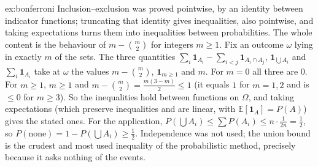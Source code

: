 \begin{solution}{ex:bonferroni}
\idea Inclusion--exclusion was proved pointwise, by an identity between indicator functions; truncating that identity gives inequalities, also pointwise, and taking expectations turns them into inequalities between probabilities. The whole content is the behaviour of $m-\binom m2$ for integers $m\ge1$.
\writeup Fix an outcome $\omega$ lying in exactly $m$ of the sets. The three quantities $\sum_i\mathbf 1_{A_i}-\sum_{i<j}\mathbf 1_{A_i\cap A_j}$, $\mathbf 1_{\bigcup A_i}$ and $\sum_i\mathbf 1_{A_i}$ take at $\omega$ the values $m-\binom m2$, $\mathbf 1_{m\ge1}$ and $m$. For $m=0$ all three are $0$. For $m\ge1$, $m\ge1$ and $m-\binom m2=\frac{m(3-m)}2\le1$ (it equals $1$ for $m=1,2$ and is $\le0$ for $m\ge3$). So the inequalities hold between functions on $\Omega$, and taking expectations (which preserve inequalities and are linear, with $\mathbb E[\mathbf 1_A]=P(A)$) gives the stated ones. For the application, $P(\bigcup A_i)\le\sum P(A_i)\le n\cdot\frac1{2n}=\frac12$, so $P(\text{none})=1-P(\bigcup A_i)\ge\frac12$. Independence was not used; the union bound is the crudest and most used inequality of the probabilistic method, precisely because it asks nothing of the events.
\end{solution}

